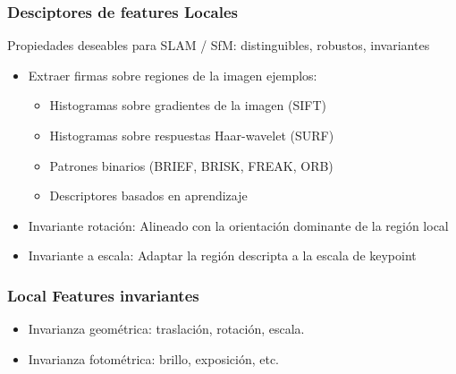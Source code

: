 \begin{frame}
	\frametitle{Desciptores de features Locales}
	\footnotesize
	
	Propiedades deseables para SLAM / SfM: distinguibles, robustos, invariantes
	\begin{itemize}
		\item Extraer firmas sobre regiones de la imagen ejemplos:
		\begin{itemize}
			\item Histogramas sobre gradientes de la imagen (SIFT)
			\item Histogramas sobre respuestas Haar-wavelet (SURF)
			\item Patrones binarios (BRIEF, BRISK, FREAK, ORB)
			\item Descriptores basados en aprendizaje
		\end{itemize}
		\item Invariante rotación: Alineado con la orientación dominante de la región local
		\item Invariante a escala: Adaptar la región descripta a la escala de keypoint
	\end{itemize}

 \begin{figure}[!h]
		\centering
		\hspace{1cm}
	\end{figure}
	
\end{frame}

\begin{frame}
	\frametitle{Local Features invariantes}
	\footnotesize
	
	\begin{itemize}
		\item Invarianza geométrica: traslación, rotación, escala.
		\item Invarianza fotométrica: brillo, exposición, etc.
	\end{itemize}
	 

\end{frame}

